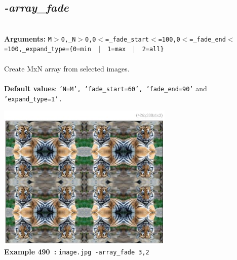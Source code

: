 \documentclass[a4paper,11pt,twoside]{book}
\begin{document}
\subsection{\emph{-array\_fade} }\vspace*{-0.5em}
~\\\textbf{Arguments: } 
{\small \texttt{M$>$0,\_N$>$0,0$<$=\_fade\_start$<$=100,0$<$=\_fade\_end$<$=100,\_expand\_type=\{0=min ~$|$~ 1=max ~$|$~ 2=all\}}}\\~\\
Create MxN array from selected images.
~\\~\\\textbf{Default values}: {\small \texttt{'N=M', 'fade\_start=60', 'fade\_end=90'} and \texttt{'expand\_type=1'.}}
\begin{center}\includegraphics[keepaspectratio=true,height=7cm,width=\textwidth]{img/gmic_def490.jpg}\\
{\footnotesize \textbf{Example 490~:} \texttt{image.jpg -array\_fade 3,2}}
\end{center}
\end{document}
